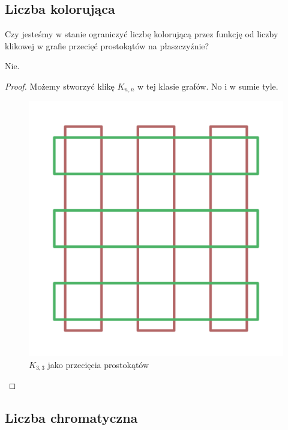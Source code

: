 \subsection{Liczba kolorująca}
Czy jesteśmy w stanie ograniczyć liczbę kolorującą przez funkcję od liczby klikowej w grafie przecięć prostokątów na płaszczyźnie?
\begin{theorem}
	Nie.
\end{theorem}
\begin{proof}
	Możemy stworzyć klikę $K_{n,n}$ w tej klasie grafów. No i w sumie tyle.
	\begin{figure}[H]
		\centering
		\includegraphics[scale=0.35]{images/objects_on_plane/k_3_3_of_rectangles.png}
		\caption{$K_{3,3}$ jako przecięcia prostokątów}
	\end{figure}
\end{proof}
\subsection{Liczba chromatyczna}

